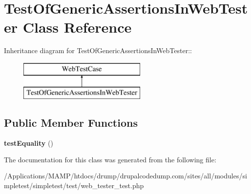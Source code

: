 \hypertarget{class_test_of_generic_assertions_in_web_tester}{
\section{TestOfGenericAssertionsInWebTester Class Reference}
\label{class_test_of_generic_assertions_in_web_tester}
}
Inheritance diagram for TestOfGenericAssertionsInWebTester::\begin{figure}[H]
\begin{center}
\leavevmode
\includegraphics[height=2cm]{class_test_of_generic_assertions_in_web_tester}
\end{center}
\end{figure}
\subsection*{Public Member Functions}
\begin{DoxyCompactItemize}
\item 
\hypertarget{class_test_of_generic_assertions_in_web_tester_a2794c86eb4f1d129ef93e694e5387944}{
{\bfseries testEquality} ()}
\label{class_test_of_generic_assertions_in_web_tester_a2794c86eb4f1d129ef93e694e5387944}

\end{DoxyCompactItemize}


The documentation for this class was generated from the following file:\begin{DoxyCompactItemize}
\item 
/Applications/MAMP/htdocs/drump/drupalcodedump.com/sites/all/modules/simpletest/simpletest/test/web\_\-tester\_\-test.php\end{DoxyCompactItemize}
